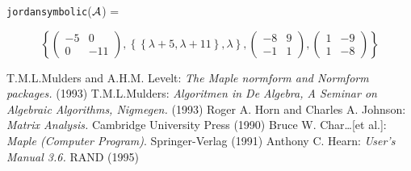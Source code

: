 {\tt jordansymbolic}(${\cal A}$) = 
\begin{center}
\begin{displaymath}
\left\{ \left( \begin{array}{cc} -5 & 0 \\ 0 & -11 \end{array} \right),
\left\{ \left\{ \lambda + 5, \lambda + 11  \right\}, \lambda \right\}, 
\left( \begin{array}{cc} -8 & 9 \\ -1 & 1 \end{array} \right), \left( 
\begin{array}{cc} 1 & -9 \\ 1 & -8 \end{array} \right) \right\}
\end{displaymath}
\end{center}

\newpage
\begin{thebibliography}{6}
 T.M.L.Mulders and A.H.M. Levelt: {\it The Maple 
        normform and Normform packages.} (1993)
 T.M.L.Mulders: {\it Algoritmen in De Algebra, A 
        Seminar on Algebraic Algorithms, Nigmegen.} (1993)
 Roger A. Horn and Charles A. Johnson: {\it Matrix 
        Analysis.} Cambridge University Press (1990)
 Bruce W. Char\ldots [et al.]: {\it Maple (Computer 
        Program)}. Springer-Verlag (1991)
 Anthony C. Hearn: {\REDUCE} {\it User's Manual 3.6.}
	RAND (1995)
\end{thebibliography}



